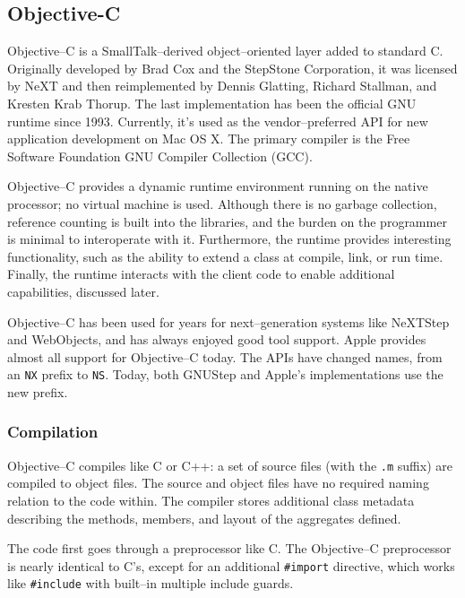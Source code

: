 \subsection{Objective-C}

Objective--C\cite{objc} is a SmallTalk--derived object--oriented layer added
to standard C. Originally developed by Brad Cox and the StepStone
Corporation\cite{dekorte}, it was licensed by NeXT and then reimplemented by
Dennis Glatting, Richard Stallman, and Kresten Krab Thorup. The last
implementation has been the official GNU runtime since 1993\cite{dekorte}.
Currently, it's used as the vendor--preferred API for new application
development on Mac OS X. The primary compiler is the Free Software Foundation
GNU Compiler Collection (GCC).

Objective--C provides a dynamic runtime environment running on the native
processor; no virtual machine is used. Although there is no garbage
collection, reference counting is built into the libraries, and the burden on
the programmer is minimal to interoperate with it. Furthermore, the runtime
provides interesting functionality, such as the ability to extend a class at
compile, link, or run time. Finally, the runtime interacts with the client
code to enable additional capabilities, discussed later.

Objective--C has been used for years for next--generation systems like
NeXTStep and WebObjects, and has always enjoyed good tool support. Apple
provides almost all support for Objective--C today. The APIs have changed
names, from an \texttt{NX} prefix to \texttt{NS}. Today, both
GNUStep\cite{gnustep} and Apple's implementations use the new prefix.

\subsubsection{Compilation}	

Objective--C compiles like C or C++: a set of source files (with the
\texttt{.m} suffix) are compiled to object files. The source and object files
have no required naming relation to the code within. The compiler stores
additional class metadata describing the methods, members, and layout of the
aggregates defined.

The code first goes through a preprocessor like C. The Objective--C
preprocessor is nearly identical to C's, except for an additional
\texttt{\#import} directive, which works like \texttt{\#include} with
built--in multiple include guards.

